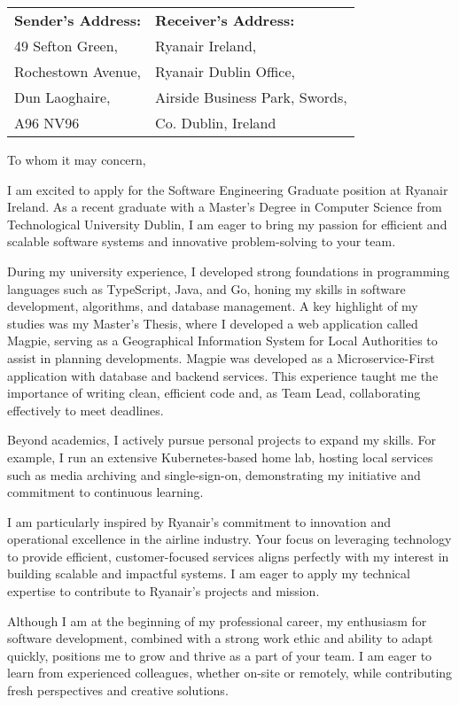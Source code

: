 \documentclass[11pt]{letter}
\begin{document}
\begin{letter}{}

\noindent\begin{tabular}{p{} p{}} \textbf{Sender's
    Address:} & \textbf{Receiver's Address:} \\
    49 Sefton Green, & Ryanair Ireland, \\
    Rochestown Avenue, & Ryanair Dublin Office, \\
    Dun Laoghaire, & Airside Business Park, Swords, \\
    A96 NV96 & Co. Dublin, Ireland \\
    \end{tabular}

\opening{To whom it may concern,}

I am excited to apply for the Software Engineering Graduate position at Ryanair
Ireland. As a recent graduate with a Master’s Degree in Computer Science from
Technological University Dublin, I am eager to bring my passion for efficient
and scalable software systems and innovative problem-solving to your team.

During my university experience, I developed strong foundations in programming
languages such as TypeScript, Java, and Go, honing my skills in software
development, algorithms, and database management. A key highlight of my studies
was my Master's Thesis, where I developed a web application called Magpie,
serving as a Geographical Information System for Local Authorities to assist in
planning developments. Magpie was developed as a Microservice-First application
with database and backend services. This experience taught me the importance of
writing clean, efficient code and, as Team Lead, collaborating effectively to
meet deadlines.

Beyond academics, I actively pursue personal projects to expand my skills. For
example, I run an extensive Kubernetes-based home lab, hosting local services
such as media archiving and single-sign-on, demonstrating my initiative and
commitment to continuous learning.

I am particularly inspired by Ryanair’s commitment to innovation and operational
excellence in the airline industry. Your focus on leveraging technology to
provide efficient, customer-focused services aligns perfectly with my interest
in building scalable and impactful systems. I am eager to apply my technical
expertise to contribute to Ryanair’s projects and mission.

Although I am at the beginning of my professional career, my enthusiasm for
software development, combined with a strong work ethic and ability to adapt
quickly, positions me to grow and thrive as a part of your team. I am eager to
learn from experienced colleagues, whether on-site or remotely, while
contributing fresh perspectives and creative solutions.


\end{letter}
\end{document}
